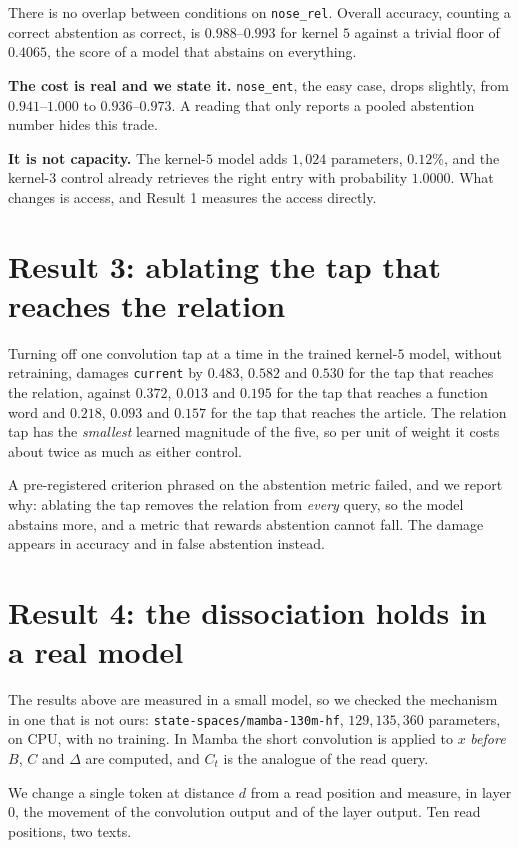 \documentclass[11pt,a4paper]{article}
\begin{document}
There is no overlap between conditions on \texttt{nose\_rel}. Overall accuracy, counting a correct
abstention as correct, is $0.988$--$0.993$ for kernel $5$ against a trivial floor of $0.4065$, the score
of a model that abstains on everything.

\textbf{The cost is real and we state it.} \texttt{nose\_ent}, the easy case, drops slightly, from
$0.941$--$1.000$ to $0.936$--$0.973$. A reading that only reports a pooled abstention number hides this
trade.

\textbf{It is not capacity.} The kernel-$5$ model adds $1{,}024$ parameters, $0.12\%$, and the kernel-$3$
control already retrieves the right entry with probability $1.0000$. What changes is access, and Result
1 measures the access directly.

\section{Result 3: ablating the tap that reaches the relation}

Turning off one convolution tap at a time in the trained kernel-$5$ model, without retraining, damages
\texttt{current} by $0.483$, $0.582$ and $0.530$ for the tap that reaches the relation, against $0.372$,
$0.013$ and $0.195$ for the tap that reaches a function word and $0.218$, $0.093$ and $0.157$ for the
tap that reaches the article. The relation tap has the \emph{smallest} learned magnitude of the five,
so per unit of weight it costs about twice as much as either control.

A pre-registered criterion phrased on the abstention metric failed, and we report why: ablating the tap
removes the relation from \emph{every} query, so the model abstains more, and a metric that rewards
abstention cannot fall. The damage appears in accuracy and in false abstention instead.

\section{Result 4: the dissociation holds in a real model}

The results above are measured in a small model, so we checked the mechanism in one that is not ours:
\texttt{state-spaces/mamba-130m-hf}, $129{,}135{,}360$ parameters, on CPU, with no training. In Mamba
the short convolution is applied to $x$ \emph{before} $B$, $C$ and $\Delta$ are computed, and $C_t$ is
the analogue of the read query.

We change a single token at distance $d$ from a read position and measure, in layer $0$, the movement
of the convolution output and of the layer output. Ten read positions, two texts.
\end{document}

